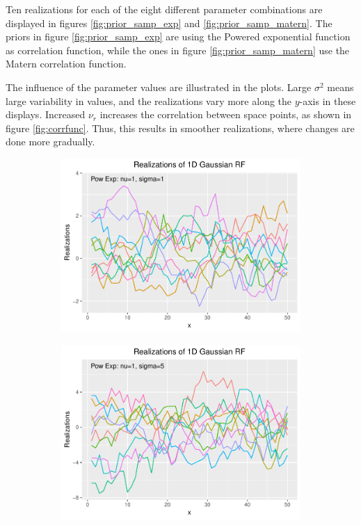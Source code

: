 Ten realizations for each of the eight different parameter combinations are displayed in figures \ref{fig:prior_samp_exp} and \ref{fig:prior_samp_matern}. The priors in figure \ref{fig:prior_samp_exp} are using the Powered exponential function as correlation function, while the ones in figure \ref{fig:prior_samp_matern} use the Matern correlation function.

The influence of the parameter values are illustrated in the plots. Large $\sigma^2$ means large variability in values, and the realizations vary more along the $y$-axis in these displays. Increased $\nu_r$ increases the correlation between space points, as shown in figure \ref{fig:corrfunc}. Thus, this results in smoother realizations, where changes are done more gradually.

\begin{figure}
\centering
    \begin{subfigure}[H]{0.49\textwidth}
        \centering
        \includegraphics[scale=0.5,trim=0cm 0cm 0cm 0cm]{figures/sample1conf1.pdf}
    \end{subfigure}
    \hfill
    \begin{subfigure}[H]{0.49\textwidth}  
        \centering 
        \includegraphics[scale=0.5,trim=0cm 0cm 0cm 0cm]{figures/sample1conf2.pdf}
    \end{subfigure}


\end{figure}
